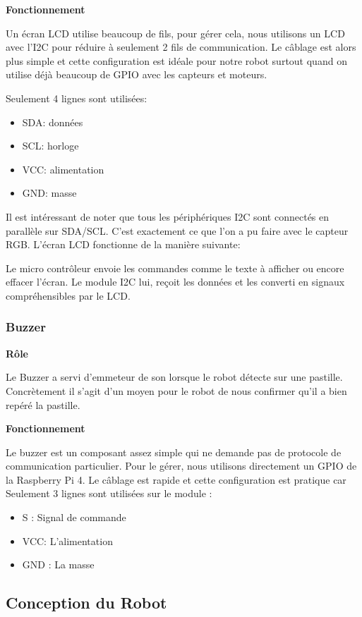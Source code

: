 \documentclass[11pt,a4paper]{article}
\begin{document}
\textbf{Fonctionnement}

Un écran LCD utilise beaucoup de fils, pour gérer cela, nous utilisons un LCD avec l’I2C pour réduire à seulement 2 fils de communication. Le câblage est alors plus simple et cette configuration est idéale pour notre robot surtout quand on utilise déjà beaucoup de GPIO avec les capteurs et moteurs. 

Seulement 4 lignes sont utilisées: 
\begin{itemize}
    \item SDA: données
    \item SCL: horloge
    \item VCC: alimentation
    \item GND: masse
\end{itemize}
Il est intéressant de noter que tous les périphériques I2C sont connectés en parallèle sur SDA/SCL. C’est exactement ce que l’on a pu faire avec le capteur RGB.
L’écran LCD fonctionne de la manière suivante:

Le micro contrôleur envoie les commandes comme le texte à afficher ou encore effacer l’écran. Le module I2C lui, reçoit les données et les converti en signaux compréhensibles par le LCD.
\newpage
\subsubsection{Buzzer}
\textbf{Rôle}

Le Buzzer a servi d'emmeteur de son lorsque le robot détecte sur une pastille. 
Concrètement il s'agit d'un moyen pour le robot de nous confirmer qu'il a bien repéré la pastille.

\textbf{Fonctionnement}

Le buzzer est un composant assez simple qui ne demande pas de protocole de communication particulier. Pour le gérer, nous utilisons directement un GPIO de la Raspberry Pi 4. Le câblage est rapide et cette configuration est pratique car Seulement 3 lignes sont utilisées sur le module : 
\begin{itemize}
    \item S : Signal de commande
    \item VCC: L'alimentation
    \item GND : La masse
\end{itemize}

\subsection{Conception du Robot}
\end{document}
